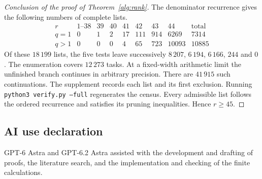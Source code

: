 \documentclass[11pt]{amsart}
\numberwithin{equation}{section}
\theoremstyle{definition}
\theoremstyle{plain}
\begin{document}
\begin{proof}[Conclusion of the proof of Theorem~\ref{alg:rank}]
The denominator recurrence gives the following numbers of complete lists.
\[
\begin{array}{c|rrrrrrr|r}
 r&1\text{--}38&39&40&41&42&43&44&\text{total}\\ \hline
 q=1&0&1&2&17&111&914&6269&7314\\
 q>1&0&0&0&4&65&723&10093&10885
\end{array}
\]
Of these $18\,199$ lists, the five tests leave successively
$8\,207$, $6\,194$, $6\,166$, $244$ and $0$. The enumeration covers
$12\,273$ tasks. At a fixed-width arithmetic limit the unfinished branch
continues in arbitrary precision. There are $41\,915$ such continuations.
The supplement records each list and its first exclusion. Running
\texttt{python3 verify.py --full} regenerates the census. Every admissible
list follows the ordered recurrence and satisfies its pruning inequalities.
Hence $r\ge45$.
\end{proof}

\subsection*{AI use declaration}
GPT-6 Astra and GPT-6.2 Astra assisted with the development and drafting of proofs, the literature search, and the implementation and checking of the finite calculations.
\end{document}
